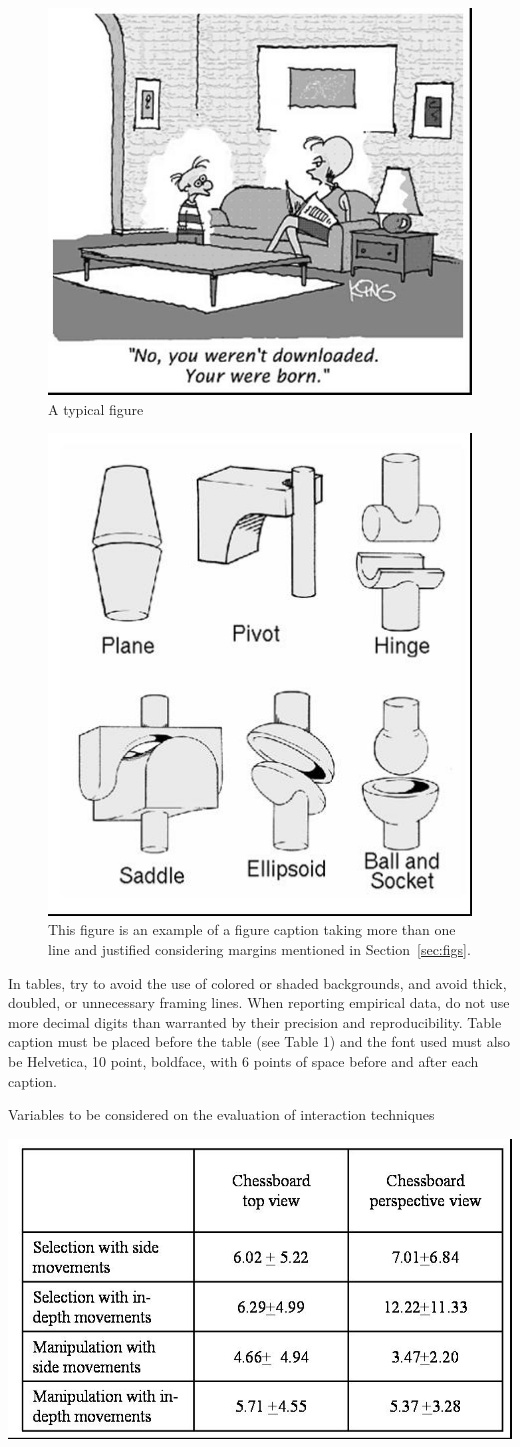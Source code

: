 \documentclass[12pt]{article}
\begin{document}
\begin{figure}[ht]
\centering
\includegraphics[width=.5\textwidth]{fig1.jpg}
\caption{A typical figure}
\label{fig:exampleFig3}
\end{figure}

\begin{figure}[ht]
\centering
\includegraphics[width=.3\textwidth]{fig2.jpg}
\caption{This figure is an example of a figure caption taking more than one
  line and justified considering margins mentioned in Section~\ref{sec:figs}.}
\label{fig:exampleFig4}
\end{figure}

In tables, try to avoid the use of colored or shaded backgrounds, and avoid
thick, doubled, or unnecessary framing lines. When reporting empirical data,
do not use more decimal digits than warranted by their precision and
reproducibility. Table caption must be placed before the table (see Table 1)
and the font used must also be Helvetica, 10 point, boldface, with 6 points of
space before and after each caption.

\begin{table}[ht]
\centering
\caption{Variables to be considered on the evaluation of interaction
  techniques}
\label{tab:exTable1}
\includegraphics[width=.7\textwidth]{table.jpg}
\end{table}
\end{document}
